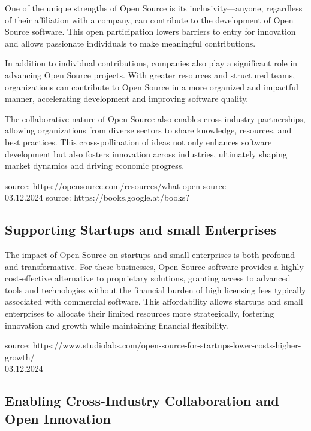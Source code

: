 One of the unique strengths of Open Source is its inclusivity—anyone, regardless of their affiliation with a company, 
can contribute to the development of Open Source software. 
This open participation lowers barriers to entry for innovation and allows passionate individuals to make meaningful contributions.

In addition to individual contributions, companies also play a significant role in advancing Open Source projects. 
With greater resources and structured teams, organizations can contribute to Open Source in a more organized and impactful manner, 
accelerating development and improving software quality.

The collaborative nature of Open Source also enables cross-industry partnerships, allowing organizations from diverse sectors to share knowledge, 
resources, and best practices. This cross-pollination of ideas not only enhances software development but also fosters innovation across industries, 
ultimately shaping market dynamics and driving economic progress.

source: https://opensource.com/resources/what-open-source \\ 03.12.2024
source: https://books.google.at/books?%

\subsection{Supporting Startups and small Enterprises}

The impact of Open Source on startups and small enterprises is both profound and transformative. 
For these businesses, Open Source software provides a highly cost-effective alternative to proprietary solutions, 
granting access to advanced tools and technologies without the financial burden of high licensing fees typically associated with commercial software. 
This affordability allows startups and small enterprises to allocate their limited resources more strategically,
fostering innovation and growth while maintaining financial flexibility.

source:  https://www.studiolabs.com/open-source-for-startups-lower-costs-higher-growth/ \\ 03.12.2024


\subsection{Enabling Cross-Industry Collaboration and Open Innovation}

